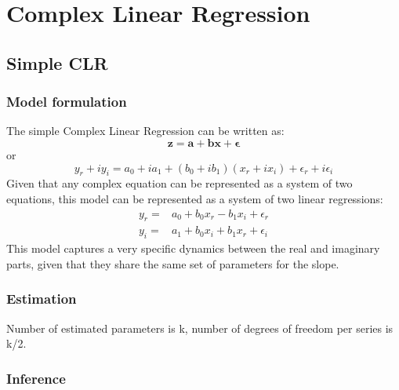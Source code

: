 \documentclass[
]{book}
\begin{document}
\hypertarget{CLR}{%
\chapter{Complex Linear Regression}\label{CLR}}

\hypertarget{simple-clr}{%
\section{Simple CLR}\label{simple-clr}}

\hypertarget{model-formulation}{%
\subsection{Model formulation}\label{model-formulation}}

The simple Complex Linear Regression can be written as:
\begin{equation}
    \mathbf{z} = \mathbf{a} + \mathbf{b} \mathbf{x} + \boldsymbol{\epsilon}
    \label{eq:SimpleCLRComplex}
\end{equation}
or
\begin{equation}
    y_r + i y_i = a_0 + i a_1 + (b_0 + i b_1) (x_r + i x_i) + \epsilon_r + i \epsilon_i
    \label{eq:SimpleCLR}
\end{equation}
Given that any complex equation can be represented as a system of two equations, this model can be represented as a system of two linear regressions:
\begin{equation}
    \begin{aligned}
        y_r = & a_0 + b_0 x_r - b_1 x_i + \epsilon_r \\
        y_i = & a_1 + b_0 x_i + b_1 x_r + \epsilon_i
    \end{aligned}
    \label{eq:SimpleCLRSystem}
\end{equation}
This model captures a very specific dynamics between the real and imaginary parts, given that they share the same set of parameters for the slope.

\hypertarget{estimation}{%
\subsection{Estimation}\label{estimation}}

Number of estimated parameters is k, number of degrees of freedom per series is k/2.

\hypertarget{inference}{%
\subsection{Inference}\label{inference}}
\end{document}
